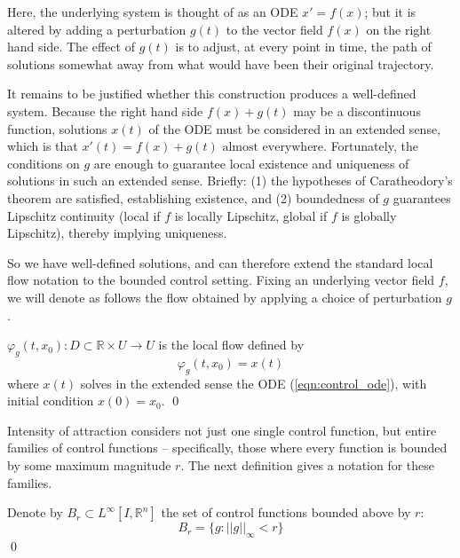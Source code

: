 Here, the underlying system is thought of as an ODE $x'=f(x)$; but it is altered by adding a perturbation $g(t)$ to the vector field $f(x)$ on the right hand side. The effect of $g(t)$ is to adjust, at every point in time, the path of solutions somewhat away from what would have been their original trajectory. 

It remains to be justified whether this construction produces a well-defined system. Because the right hand side $f(x) + g(t)$ may be a discontinuous function, solutions $x(t)$ of the ODE must be considered in an extended sense, which is that $x'(t) = f(x) + g(t) \text{ almost everywhere.}$ Fortunately, the conditions on $g$ are enough to guarantee local existence and uniqueness of solutions in such an extended sense. Briefly: (1) the hypotheses of Caratheodory's theorem are satisfied, establishing existence, and (2) boundedness of $g$ guarantees Lipschitz continuity (local if $f$ is locally Lipschitz, global if $f$ is globally Lipschitz), thereby implying uniqueness. 

So we have well-defined solutions, and can therefore extend the standard local flow notation to the bounded control setting. Fixing an underlying vector field $f$, we will denote as follows the flow obtained by applying a choice of perturbation $g$.

\begin{definition} 
	$\varphi_g(t, x_0): D \subset \mathbb{R} \times U \to U$ is the local flow defined by $$\varphi_g(t, x_0) = x(t)$$ where $x(t)$ solves in the extended sense the ODE (\ref{eqn:control_ode}), with initial condition $x(0) = x_0$. \qed
\end{definition}

Intensity of attraction considers not just one single control function, but entire families of control functions -- specifically, those where every function is bounded by some maximum magnitude $r$. %
The next definition gives a notation for these families.


\begin{definition}
	Denote by $B_r \subset L^\infty[I, \mathbb{R}^n]$ the set of control functions bounded above by $r$:
	$$B_r = \{g  : ||g||_\infty < r\}$$ \qed
\end{definition}


